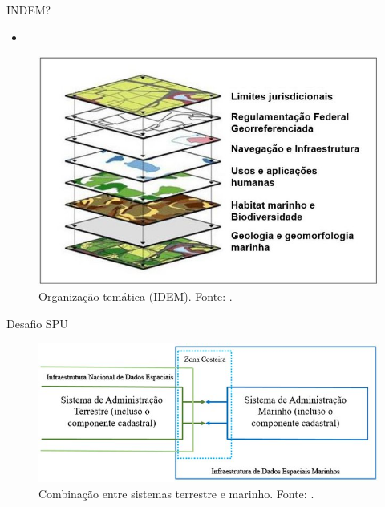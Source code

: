 \documentclass[9pt,ignorenonframetext,]{beamer}
\providecommand{\tightlist}{%
  \setlength{\itemsep}{0pt}\setlength{\parskip}{0pt}}
\begin{document}
\begin{frame}{INDEM?}
\protect\hypertarget{indem}{}

\begin{itemize}[<+->]
\tightlist
\item
  \textcite{IDEM}
\end{itemize}

\begin{figure}[H]

{\centering \includegraphics[width=0.7\linewidth]{Figura-4-Exemplo-da-organizacao-dos-temas-de-uma-IDEM_W640} 

}

\caption{Organização temática (IDEM). Fonte: \textcite{IDEM}.}\label{fig:unnamed-chunk-3}
\end{figure}

\end{frame}

\begin{frame}{Desafio SPU}
\protect\hypertarget{desafio-spu}{}

\begin{figure}[H]

{\centering \includegraphics[width=0.7\linewidth]{Figura-3-Combinacao-entre-os-sistemas-de-gerenciamento-terrestre-e-marinho_W640} 

}

\caption{Combinação entre sistemas terrestre e marinho. Fonte: \textcite{IDEM}.}\label{fig:unnamed-chunk-4}
\end{figure}

\end{frame}
\end{document}
